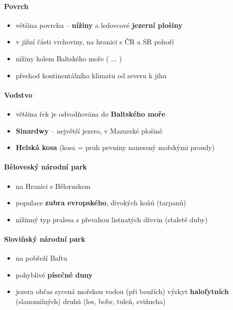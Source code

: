 \paragraph{Povrch}
\begin{itemize}
\item většina povrchu -- \textbf{nížiny} a ledovcové \textbf{jezerní plošiny}
\item v jižní části vrchoviny, na hranici s ČR a SR pohoří
\item nížiny kolem Baltského moře ( ... )
\item přechod kontinentálního klimatu od severu k jihu
\end{itemize}

\paragraph{Vodstvo}
\begin{itemize}
\item většina řek je odvodňována do \textbf{Baltského moře}
\item \textbf{Sinardwy} -- největší jezero, v Mazurské plošině
\item \textbf{Helská kosa} (kosa = pruh pevniny nanesený mořskými proudy)
\end{itemize}

\paragraph{Běloveský národní park}
\begin{itemize}
\item na Hranici s Běloruskem
\item populace \textbf{zubra evropského}, divokých koňů (tarpanů)
\item nížinný typ pralesa s převahou listnatých dřevin (staleté duby)
\end{itemize}

\paragraph{Sloviňský národní park}
\begin{itemize}
\item na pobřeží Baltu
\item pohyblivé \textbf{písečné duny}
\item jezera občas sycená mořskou vodou (při bouřích) \ra výskyt \textbf{halofytních} (slanomilných) druhů (los, bobr, tuleň, sviňucha)
\end{itemize}


